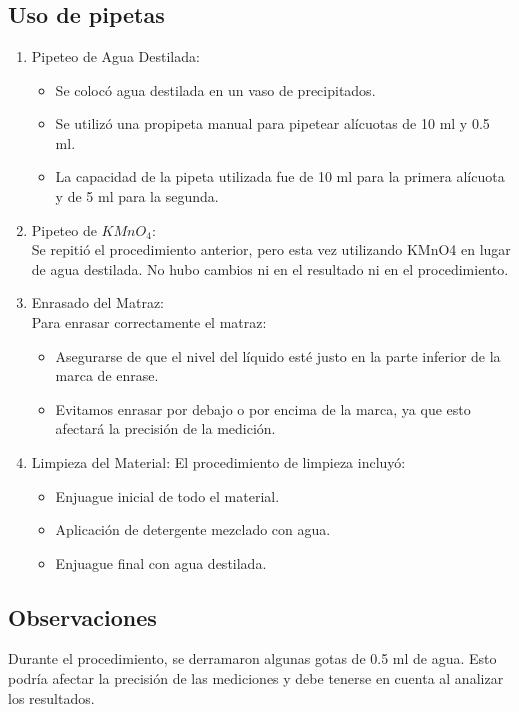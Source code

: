 \documentclass[12pt]{report}
\begin{document}
\chapter{}
\section{Uso de pipetas}

\begin{enumerate}
  \item Pipeteo de Agua Destilada:
    \begin{itemize}
      \item Se colocó agua destilada en un vaso de precipitados.
      \item Se utilizó una propipeta manual para pipetear alícuotas de 10 ml y 0.5 ml.
      \item La capacidad de la pipeta utilizada fue de 10 ml para la primera alícuota y de 5 ml para la segunda.
    \end{itemize}
  \item Pipeteo de $KMnO_4$:
\\Se repitió el procedimiento anterior, pero esta vez utilizando KMnO4 en lugar de agua destilada. No hubo cambios ni en el resultado ni en el procedimiento.
  \item Enrasado del Matraz:
\\Para enrasar correctamente el matraz:
    \begin{itemize}
      \item Asegurarse de que el nivel del líquido esté justo en la parte inferior de la marca de enrase.
      \item Evitamos enrasar por debajo o por encima de la marca, ya que esto afectará la precisión de la medición.
    \end{itemize}
  \item Limpieza del Material:
El procedimiento de limpieza incluyó:
    \begin{itemize}
      \item Enjuague inicial de todo el material.
      \item Aplicación de detergente mezclado con agua.
      \item Enjuague final con agua destilada.
    \end{itemize}
\end{enumerate}

\section*{Observaciones}
Durante el procedimiento, se derramaron algunas gotas de 0.5 ml de agua. Esto podría afectar la precisión de las mediciones y debe tenerse en cuenta al analizar los resultados.
\end{document}
